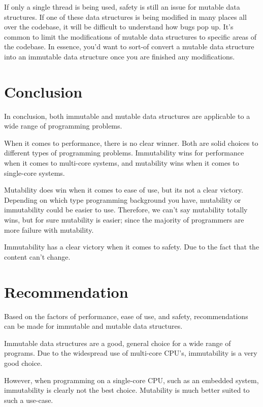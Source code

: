 \documentclass[11pt]{article}
\begin{document}
If only a single thread is being used, safety is still an issue for mutable
data structures. If one of these data structures is being modified in many
places all over the codebase, it will be difficult to understand how bugs pop
up. It's common to limit the modifications of mutable data structures to
specific areas of the codebase. In essence, you'd want to sort-of convert a
mutable data structure into an immutable data structure once you are finished
any modifications.
\clearpage

\section*{Conclusion}
In conclusion, both immutable and mutable data structures are applicable to a
wide range of programming problems.

When it comes to performance, there is no clear winner. Both are solid choices
to different types of programming problems. Immutability wins for performance
when it comes to multi-core systems, and mutability wins when it comes to
single-core systems.

Mutability does win when it comes to ease of use, but its not a clear victory.
Depending on which type programming background you have, mutability or
immutability could be easier to use. Therefore, we can't say mutability totally
wins, but for sure mutability is easier; since the majority of programmers
are more failure with mutability.

Immutability has a clear victory when it comes to safety. Due to the fact that
the content can't change.

\section*{Recommendation}
Based on the factors of performance, ease of use, and safety, recommendations
can be made for immutable and mutable data structures.

Immutable data structures are a good, general choice for a wide range of
programs. Due to the widespread use of multi-core CPU's, immutability is a
very good choice.

However, when programming on a single-core CPU, such as an embedded system,
immutability is clearly not the best choice. Mutability is much better suited to
such a use-case.

\clearpage
\end{document}
